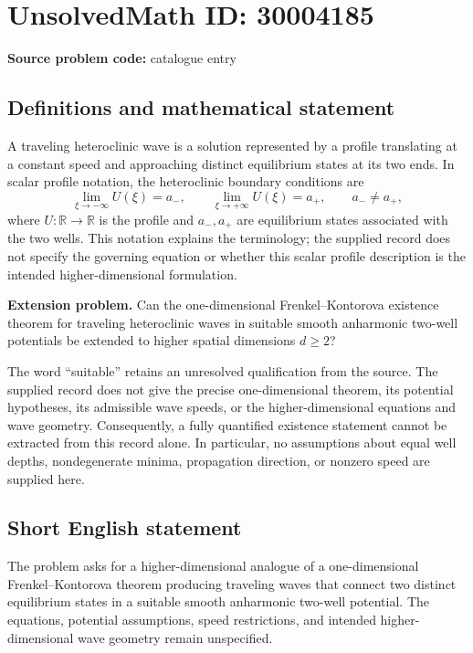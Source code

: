 \documentclass[11pt]{article}
\newcommand{\R}{\mathbb{R}}
\begin{document}
\section*{UnsolvedMath ID: 30004185}
\textbf{Source problem code:} catalogue entry
\subsection{Definitions and mathematical statement}
A traveling heteroclinic wave is a solution represented by a profile translating at a constant speed and approaching distinct equilibrium states at its two ends. In scalar profile notation, the heteroclinic boundary conditions are
\[
\lim_{\xi\to-\infty}U(\xi)=a_-,\qquad
\lim_{\xi\to+\infty}U(\xi)=a_+,\qquad a_-\ne a_+,
\]
where \(U\colon\R\to\R\) is the profile and \(a_-,a_+\) are equilibrium states associated with the two wells. This notation explains the terminology; the supplied record does not specify the governing equation or whether this scalar profile description is the intended higher-dimensional formulation.

\textbf{Extension problem.} Can the one-dimensional Frenkel--Kontorova existence theorem for traveling heteroclinic waves in suitable smooth anharmonic two-well potentials be extended to higher spatial dimensions \(d\ge 2\)?

The word ``suitable'' retains an unresolved qualification from the source. The supplied record does not give the precise one-dimensional theorem, its potential hypotheses, its admissible wave speeds, or the higher-dimensional equations and wave geometry. Consequently, a fully quantified existence statement cannot be extracted from this record alone. In particular, no assumptions about equal well depths, nondegenerate minima, propagation direction, or nonzero speed are supplied here.
\subsection{Short English statement}
The problem asks for a higher-dimensional analogue of a one-dimensional Frenkel--Kontorova theorem producing traveling waves that connect two distinct equilibrium states in a suitable smooth anharmonic two-well potential. The equations, potential assumptions, speed restrictions, and intended higher-dimensional wave geometry remain unspecified.
\end{document}
